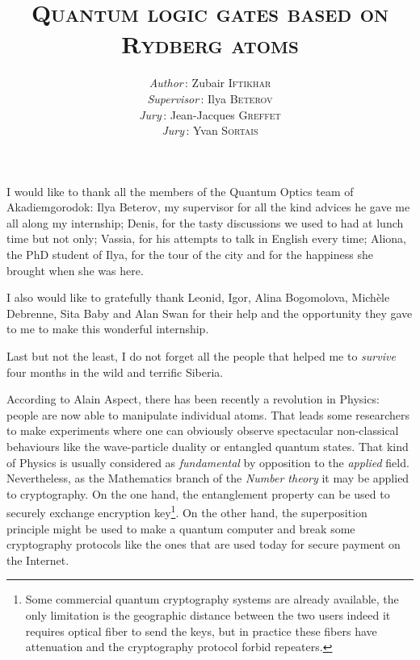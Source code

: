\documentclass[twoside, open=right
]{scrreprt}
\title{\rmfamily \scshape Quantum logic gates based on \\ Rydberg atoms \vspace{5cm} }
\author{
  \textit{Author}\,: \hspace{3cm} \hfill Zubair \textsc{Iftikhar} \\
  \textit{Supervisor}\,: \hfill Ilya \textsc{Beterov} \\
  \textit{Jury}\,: \hfill Jean-Jacques \textsc{Greffet} \\
  \textit{Jury}\,: \hfill Yvan \textsc{Sortais}
}
\date{}
\begin{document}
\maketitle


\par I would like to thank all the members of the Quantum Optics team of Akadiemgorodok: Ilya Beterov, my supervisor for all the kind advices he gave me all along my internship; Denis, for the tasty discussions we used to had at lunch time but not only; Vassia, for his attempts to talk in English every time; Aliona, the PhD student of Ilya, for the tour of the city and for the happiness she brought when she was here.

\par I also would like to gratefully thank Leonid, Igor, Alina Bogomolova, Michèle Debrenne, Sita Baby and Alan Swan for their help and the opportunity they gave to me to make this wonderful internship.

\par Last but not the least, I do not forget all the people that helped me to \emph{survive} four months in the wild and terrific Siberia.

\tableofcontents


\bigskip

\par According to Alain Aspect, there has been recently a revolution in Physics: people are now able to manipulate individual atoms. That leads some researchers to make experiments where one can obviously observe spectacular non-classical behaviours like the wave-particle duality or entangled quantum states. That kind of Physics is usually considered as \emph{fundamental} by opposition to the \emph{applied} field. Nevertheless, as the Mathematics branch of the \emph{Number theory} it may be applied to cryptography. On the one hand, the entanglement property can be used to securely exchange encryption key\footnote{Some commercial quantum cryptography systems are already available, the only limitation is the geographic distance between the two users indeed it requires optical fiber to send the keys, but in practice these fibers have attenuation and the cryptography protocol forbid repeaters.}. On the other hand, the superposition principle might be used to make a quantum computer and break some cryptography protocols like the ones that are used today for secure payment on the Internet. 
\end{document}
